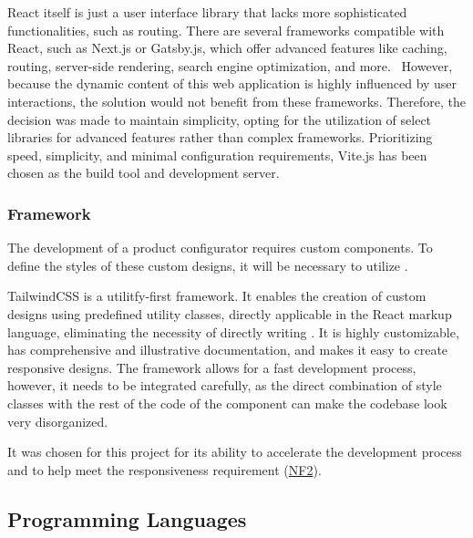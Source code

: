 React itself is just a user interface library that lacks more sophisticated functionalities, such as routing. There are several frameworks compatible with React, such as Next.js or Gatsby.js, which offer advanced features like caching, routing, server-side rendering, search engine optimization, and more.~\cite{Eze2023} However, because the dynamic content of this web application is highly influenced by user interactions, the solution would not benefit from these frameworks. Therefore, the decision was made to maintain simplicity, opting for the utilization of select libraries for advanced features rather than complex frameworks. Prioritizing speed, simplicity, and minimal configuration requirements, Vite.js has been chosen as the build tool and development server.~\cite{Said2023}


\subsubsection{ Framework}

The development of a product configurator requires custom components. To define the styles of these custom designs, it will be necessary to utilize .

TailwindCSS is a utilitfy-first  framework. It enables the creation of custom designs using predefined  utility classes, directly applicable in the React markup language, eliminating the necessity of directly writing . It is highly customizable, has comprehensive and illustrative documentation, and makes it easy to create responsive designs. The framework allows for a fast development process, however, it needs to be integrated carefully, as the direct combination of style classes with the rest of the code of the component can make the codebase look very disorganized.~\cite{TailwindCSS}

It was chosen for this project for its ability to accelerate the development process and to help meet the responsiveness requirement (\hyperref[itm:NF2]{NF2}).


\subsection{Programming Languages}

